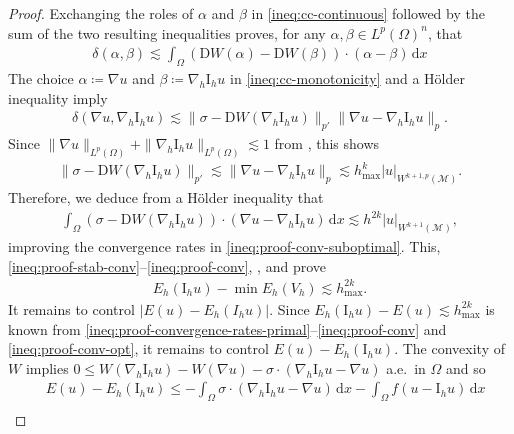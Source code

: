 \documentclass[a4paper]{amsart}
\numberwithin{equation}{section}
\renewcommand{\d}[1]{\,\mathrm{d}#1}
\newcommand{\I}{\mathrm{I}}
\newcommand{\Mcal}{\mathcal{M}}
\newcommand{\D}{\mathrm{D}}
\theoremstyle{remark}
\begin{document}
\begin{proof}
    Exchanging the roles of $\alpha$ and $\beta$ in \eqref{ineq:cc-continuous} followed by the 
    sum of the two resulting inequalities proves, for any $\alpha, \beta \in L^p(\Omega)^n$, that
    \begin{align}\label{ineq:cc-monotonicity}
        \delta(\alpha,\beta) \lesssim \int_\Omega (\D W(\alpha) - \D W(\beta)) \cdot (\alpha - \beta) \d{x}
    \end{align}
	The choice $\alpha \coloneqq \nabla u$ and $\beta \coloneqq \nabla_h \mathrm{I}_h u$ in \eqref{ineq:cc-monotonicity} and a H\"older inequality imply
	\begin{align*}
		\delta(\nabla u, \nabla_h \mathrm{I}_h u) \lesssim \|\sigma - \D W(\nabla_h \mathrm{I}_h u)\|_{p'}\|\nabla u - \nabla_h \mathrm{I}_h u\|_{p}.
	\end{align*} 
Since
$\|\nabla u\|_{L^p(\Omega)} + \|\nabla_h \mathrm{I}_h u\|_{L^p(\Omega)} \lesssim 1$
	from , 
this shows
	\begin{align}\label{ineq:conv-sigma-interp}
		\|\sigma - \D W(\nabla_h \mathrm{I}_h u)\|_{p'} \lesssim \|\nabla u - \nabla_h \mathrm{I}_h u\|_{p} \lesssim h_\mathrm{max}^{k}|u|_{W^{k+1,p}(\Mcal)}.
	\end{align}
Therefore, we deduce from a H\"older inequality that
    \begin{align}\label{ineq:proof-conv-opt}
        \int_\Omega (\sigma - \D W(\nabla_h \I_h u)) \cdot (\nabla u - \nabla_h \I_h u) \d{x} \lesssim h^{2k}|u|_{W^{k+1}(\Mcal)},
    \end{align}
    improving
    the convergence rates in \eqref{ineq:proof-conv-suboptimal}. This, \eqref{ineq:proof-stab-conv}--\eqref{ineq:proof-conv}, , and  prove
	\begin{align}\label{ineq:proof-conv-rate-1}
		E_h(\mathrm{I}_h u) - \min E_h(V_h) \lesssim h_\mathrm{max}^{2k}.
	\end{align}
It remains to control $|E(u) - E_h(I_h u)|$. Since
$E_h(\mathrm{I}_h u) - E(u) \lesssim h_\mathrm{max}^{2k}$ is known from \eqref{ineq:proof-convergence-rates-primal}--\eqref{ineq:proof-conv} and \eqref{ineq:proof-conv-opt}, it remains to control $E(u) - E_h(\mathrm{I}_h u)$.
The convexity of $W$ implies
$0 \leq W(\nabla_h \mathrm{I}_h u) - W(\nabla u) - \sigma \cdot (\nabla_h \mathrm{I}_h u - \nabla u)$ a.e.~in $\Omega$ and so  
	\begin{align*}
		&E(u) - E_h(\mathrm{I}_h u) \leq -\int_\Omega \sigma \cdot (\nabla_h \mathrm{I}_h u - \nabla u) \d{x} - \int_\Omega f(u - \I_h u) \d{x}\\

\end{align*}
\end{proof}
\end{document}
